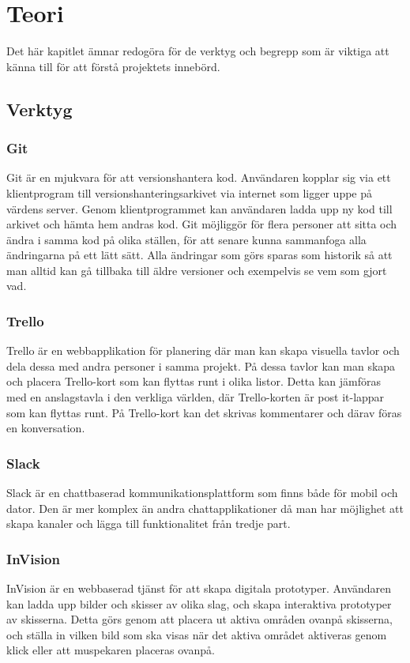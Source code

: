 \chapter{Teori}
\label{cha:theory}
Det här kapitlet ämnar redogöra för de verktyg och begrepp som är viktiga att känna till för att förstå projektets innebörd.

\section{Verktyg}
\subsection{Git}
\label{sec:theory-git}
Git är en mjukvara för att versionshantera kod. Användaren kopplar sig via ett klientprogram till versionshanteringsarkivet via internet som ligger uppe på värdens server. 
Genom klientprogrammet kan användaren ladda upp ny kod till arkivet och hämta hem andras kod. 
Git möjliggör för flera personer att sitta och ändra i samma kod på olika ställen, för att senare kunna sammanfoga alla ändringarna på ett lätt sätt. 
Alla ändringar som görs sparas som historik så att man alltid kan gå tillbaka till äldre versioner och exempelvis se vem som gjort vad. \cite{website:git}

\subsection{Trello}
\label{sec:theory-trello}
Trello är en webbapplikation för planering där man kan skapa visuella tavlor och dela dessa med andra personer i samma projekt. 
På dessa tavlor kan man skapa och placera Trello-kort som kan flyttas runt i olika listor. 
Detta kan jämföras med en anslagstavla i den verkliga världen, där Trello-korten är post it-lappar som kan flyttas runt. 
På Trello-kort kan det skrivas kommentarer och därav föras en konversation. \cite{website:trello}

\subsection{Slack}
\label{sec:theory-slack}
Slack är en chattbaserad kommunikationsplattform som finns både för mobil och dator. 
Den är mer komplex än andra chattapplikationer då man har möjlighet att skapa kanaler och lägga till funktionalitet från tredje part. \cite{website:slack} 

\subsection{InVision}
\label{sec:invision}
InVision är en webbaserad tjänst för att skapa digitala prototyper. 
Användaren kan ladda upp bilder och skisser av olika slag, och skapa interaktiva prototyper av skisserna. 
Detta görs genom att placera ut aktiva områden ovanpå skisserna, och ställa in vilken bild som ska visas när det aktiva området aktiveras genom klick eller att muspekaren placeras ovanpå.\cite{website:invision}

